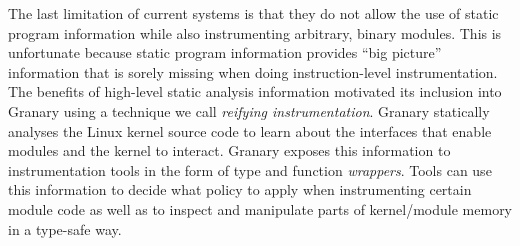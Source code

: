 \documentclass{sigplanconf}
\begin{document}



The last limitation of current systems is that they do not allow the use of static program information while also instrumenting arbitrary, binary modules. This is unfortunate because static program information provides ``big picture'' information that is sorely missing when doing instruction-level instrumentation. The benefits of high-level static analysis information motivated its inclusion into Granary using a technique we call \emph{reifying instrumentation}. Granary statically analyses the Linux kernel source code to learn about  the interfaces that enable modules and the kernel to interact. Granary exposes this information to instrumentation tools in the form of type and function \emph{wrappers}. Tools can use this information to decide what policy to apply when instrumenting certain module code as well as to inspect and manipulate parts of kernel/module memory in a type-safe way.
\end{document}
